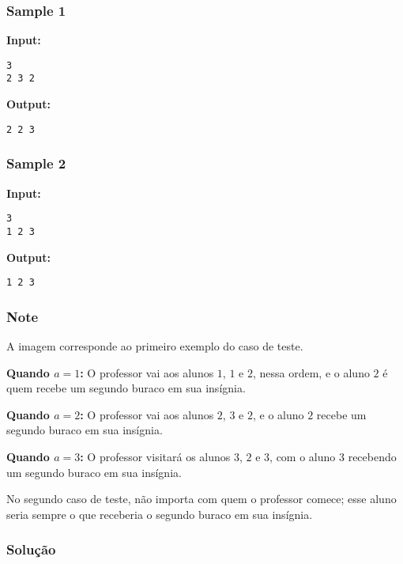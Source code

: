 \subsubsection*{Sample 1}

\textbf{Input:}
\begin{verbatim}
3
2 3 2
\end{verbatim}

\textbf{Output:}
\begin{verbatim}
2 2 3
\end{verbatim}

\subsubsection*{Sample 2}

\textbf{Input:}
\begin{verbatim}
3
1 2 3
\end{verbatim}

\textbf{Output:}
\begin{verbatim}
1 2 3
\end{verbatim}

\subsubsection*{Note}
A imagem corresponde ao primeiro exemplo do caso de teste.

\medskip
\textbf{Quando \( a = 1 \):} O professor vai aos alunos \( 1 \), \( 1 \) e \( 2 \), nessa ordem, e o aluno \( 2 \) é quem recebe um segundo buraco em sua insígnia.

\medskip
\textbf{Quando \( a = 2 \):} O professor vai aos alunos \( 2 \), \( 3 \) e \( 2 \), e o aluno \( 2 \) recebe um segundo buraco em sua insígnia.

\medskip
\textbf{Quando \( a = 3 \):} O professor visitará os alunos \( 3 \), \( 2 \) e \( 3 \), com o aluno \( 3 \) recebendo um segundo buraco em sua insígnia.

\medskip
No segundo caso de teste, não importa com quem o professor comece; esse aluno seria sempre o que receberia o segundo buraco em sua insígnia.

\subsubsection*{Solução}

